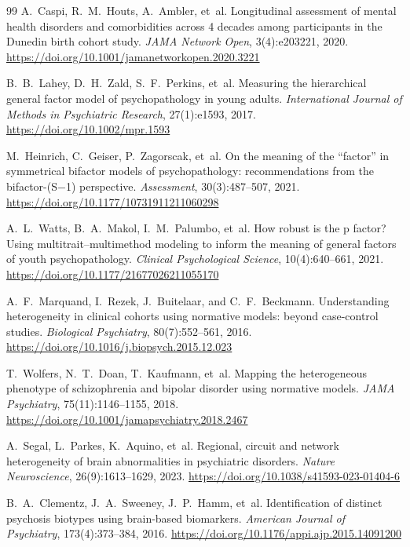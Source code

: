 \begin{thebibliography}{99}
 A.~Caspi, R.~M.~Houts, A.~Ambler, et~al.
\newblock Longitudinal assessment of mental health disorders and comorbidities across 4 decades among
participants in the Dunedin birth cohort study. \emph{JAMA Network Open}, 3(4):e203221, 2020.
\newblock \url{https://doi.org/10.1001/jamanetworkopen.2020.3221}

 B.~B.~Lahey, D.~H.~Zald, S.~F.~Perkins, et~al.
\newblock Measuring the hierarchical general factor model of psychopathology in young adults.
\emph{International Journal of Methods in Psychiatric Research}, 27(1):e1593, 2017.
\newblock \url{https://doi.org/10.1002/mpr.1593}

 M.~Heinrich, C.~Geiser, P.~Zagorscak, et~al.
\newblock On the meaning of the ``factor'' in symmetrical bifactor models of psychopathology: recommendations
from the bifactor-(S$-$1) perspective. \emph{Assessment}, 30(3):487--507, 2021.
\newblock \url{https://doi.org/10.1177/10731911211060298}

 A.~L.~Watts, B.~A.~Makol, I.~M.~Palumbo, et~al.
\newblock How robust is the p factor? Using multitrait--multimethod modeling to inform the meaning of general
factors of youth psychopathology. \emph{Clinical Psychological Science}, 10(4):640--661, 2021.
\newblock \url{https://doi.org/10.1177/21677026211055170}

 A.~F.~Marquand, I.~Rezek, J.~Buitelaar, and C.~F.~Beckmann.
\newblock Understanding heterogeneity in clinical cohorts using normative models: beyond case-control studies.
\emph{Biological Psychiatry}, 80(7):552--561, 2016. \newblock \url{https://doi.org/10.1016/j.biopsych.2015.12.023}

 T.~Wolfers, N.~T.~Doan, T.~Kaufmann, et~al.
\newblock Mapping the heterogeneous phenotype of schizophrenia and bipolar disorder using normative models.
\emph{JAMA Psychiatry}, 75(11):1146--1155, 2018. \newblock \url{https://doi.org/10.1001/jamapsychiatry.2018.2467}

 A.~Segal, L.~Parkes, K.~Aquino, et~al.
\newblock Regional, circuit and network heterogeneity of brain abnormalities in psychiatric disorders.
\emph{Nature Neuroscience}, 26(9):1613--1629, 2023. \newblock \url{https://doi.org/10.1038/s41593-023-01404-6}

 B.~A.~Clementz, J.~A.~Sweeney, J.~P.~Hamm, et~al.
\newblock Identification of distinct psychosis biotypes using brain-based biomarkers.
\emph{American Journal of Psychiatry}, 173(4):373--384, 2016. \newblock \url{https://doi.org/10.1176/appi.ajp.2015.14091200}


\end{thebibliography}
